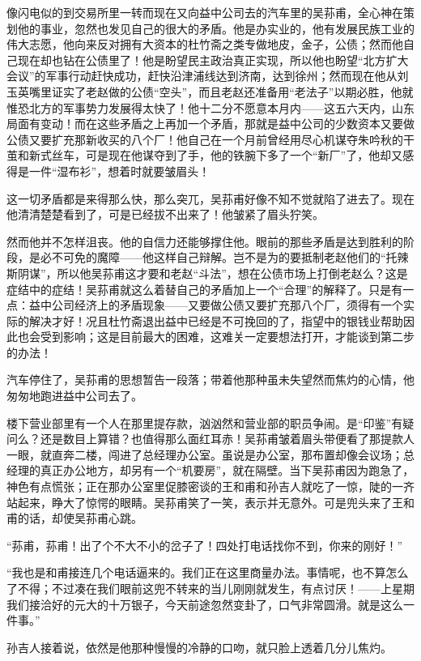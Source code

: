 \par 像闪电似的到交易所里一转而现在又向益中公司去的汽车里的吴荪甫，全心神在策划他的事业，忽然也发见自己的很大的矛盾。他是办实业的，他有发展民族工业的伟大志愿，他向来反对拥有大资本的杜竹斋之类专做地皮，金子，公债；然而他自己现在却也钻在公债里了！他是盼望民主政治真正实现，所以他也盼望“北方扩大会议”的军事行动赶快成功，赶快沿津浦线达到济南，达到徐州；然而现在他从刘玉英嘴里证实了老赵做的公债“空头”，而且老赵还准备用“老法子”以期必胜，他就惟恐北方的军事势力发展得太快了！他十二分不愿意本月内——这五六天内，山东局面有变动！而在这些矛盾之上再加一个矛盾，那就是益中公司的少数资本又要做公债又要扩充那新收买的八个厂！他自己在一个月前曾经用尽心机谋夺朱吟秋的干茧和新式丝车，可是现在他谋夺到了手，他的铁腕下多了一个“新厂”了，他却又感得是一件“湿布衫”，想着时就要皱眉头！
\par 这一切矛盾都是来得那么快，那么突兀，吴荪甫好像不知不觉就陷了进去了。现在他清清楚楚看到了，可是已经拔不出来了！他皱紧了眉头狞笑。
\par 然而他并不怎样沮丧。他的自信力还能够撑住他。眼前的那些矛盾是达到胜利的阶段，是必不可免的魔障——他这样自己辩解。岂不是为的要抵制老赵他们的“托辣斯阴谋”，所以他吴荪甫这才要和老赵“斗法”，想在公债市场上打倒老赵么？这是症结中的症结！吴荪甫就这么着替自己的矛盾加上一个“合理”的解释了。只是有一点：益中公司经济上的矛盾现象——又要做公债又要扩充那八个厂，须得有一个实际的解决才好！况且杜竹斋退出益中已经是不可挽回的了，指望中的银钱业帮助因此也会受到影响；这是目前最大的困难，这难关一定要想法打开，才能谈到第二步的办法！
\par 汽车停住了，吴荪甫的思想暂告一段落；带着他那种虽未失望然而焦灼的心情，他匆匆地跑进益中公司去了。
\par 楼下营业部里有一个人在那里提存款，汹汹然和营业部的职员争闹。是“印鉴”有疑问么？还是数目上算错？也值得那么面红耳赤！吴荪甫皱着眉头带便看了那提款人一眼，就直奔二楼，闯进了总经理办公室。虽说是办公室，那布置却像会议场；总经理的真正办公地方，却另有一个“机要房”，就在隔壁。当下吴荪甫因为跑急了，神色有点慌张；正在那办公室里促膝密谈的王和甫和孙吉人就吃了一惊，陡的一齐站起来，睁大了惊愕的眼睛。吴荪甫笑了一笑，表示并无意外。可是兜头来了王和甫的话，却使吴荪甫心跳。
\par “荪甫，荪甫！出了个不大不小的岔子了！四处打电话找你不到，你来的刚好！”
\par “我也是和甫接连几个电话逼来的。我们正在这里商量办法。事情呢，也不算怎么了不得；不过凑在我们眼前这兜不转来的当儿刚刚就发生，有点讨厌！——上星期我们接洽好的元大的十万银子，今天前途忽然变卦了，口气非常圆滑。就是这么一件事。”
\par 孙吉人接着说，依然是他那种慢慢的冷静的口吻，就只脸上透着几分儿焦灼。
